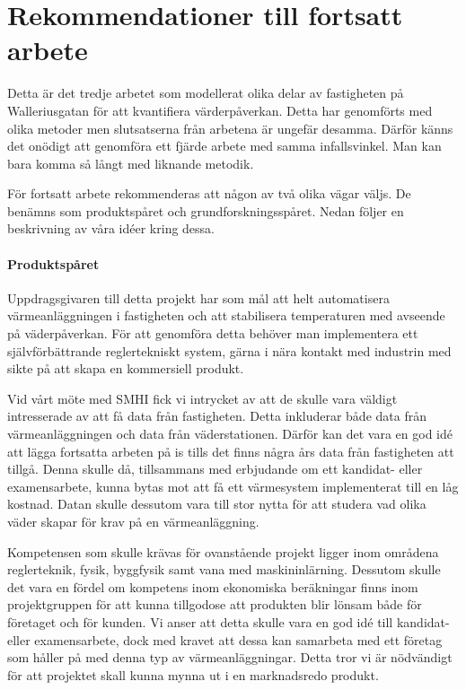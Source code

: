 \section{Rekommendationer till fortsatt arbete}

Detta är det tredje arbetet som modellerat olika delar av fastigheten på Walleriusgatan för att
kvantifiera värderpåverkan. Detta har genomförts med olika metoder men slutsatserna från arbetena är ungefär desamma.
Därför känns det onödigt att genomföra ett fjärde arbete med samma infallsvinkel. Man kan bara komma så
långt med liknande metodik.

För fortsatt arbete rekommenderas att någon av två olika vägar väljs. De benämns
som produktspåret och grundforskningsspåret. Nedan följer en beskrivning av våra idéer kring dessa.

\paragraph{Produktspåret}
Uppdragsgivaren till detta projekt har som mål att helt automatisera värmeanläggningen i fastigheten och att stabilisera
temperaturen med avseende på väderpåverkan. För att genomföra detta behöver man implementera ett självförbättrande
reglertekniskt system, gärna i nära kontakt med industrin med sikte på att skapa en kommersiell produkt. 

Vid vårt möte med SMHI fick vi intrycket av att de skulle vara väldigt intresserade av att få data från fastigheten.
Detta inkluderar både data från värmeanläggningen och data från väderstationen. Därför kan det vara
en god idé att lägga fortsatta arbeten på is tills det finns några års data från fastigheten att tillgå.
Denna skulle då, tillsammans med erbjudande om ett kandidat- eller examensarbete, kunna bytas mot att få ett värmesystem implementerat till en låg kostnad. Datan skulle dessutom vara till stor nytta för att studera vad olika väder skapar för
krav på en värmeanläggning. 

Kompetensen som skulle krävas för ovanstående projekt ligger inom områdena reglerteknik, fysik, byggfysik samt vana med maskininlärning.
Dessutom skulle det vara en fördel om kompetens inom ekonomiska beräkningar finns inom projektgruppen för att
kunna tillgodose att produkten blir lönsam både för företaget och för kunden. Vi anser att detta skulle vara en god
idé till kandidat- eller examensarbete, dock med kravet att dessa kan samarbeta med
ett företag som håller på med denna typ av värmeanläggningar. Detta tror vi är nödvändigt för att projektet skall kunna mynna ut i en marknadsredo produkt.



